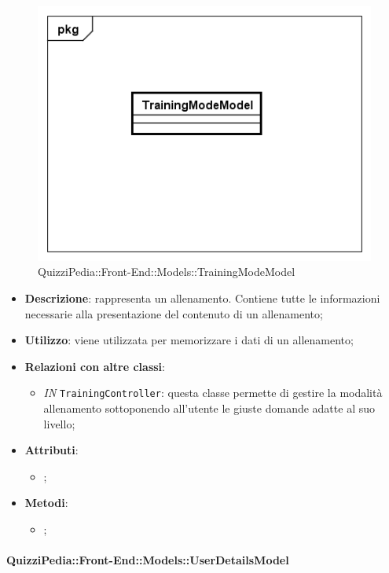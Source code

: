 		\begin{figure}[h]
			\centering
			\includegraphics[scale=0.5,keepaspectratio]{UML/Classi/Front-End/QuizziPedia_Front-end_Models_TrainingModeModel.png}
			\caption{QuizziPedia::Front-End::Models::TrainingModeModel}
		\end{figure}
		
		\begin{itemize}
			\item \textbf{Descrizione}: rappresenta un allenamento. Contiene tutte le informazioni necessarie alla
			presentazione del contenuto di un allenamento;
			\item \textbf{Utilizzo}: viene utilizzata per memorizzare i dati di un allenamento;
			\item \textbf{Relazioni con altre classi}: 
			\begin{itemize}
				\item \textit{IN} \texttt{TrainingController}: questa classe permette di gestire la modalità allenamento sottoponendo all'utente le giuste domande adatte al suo livello;
			\end{itemize}
			\item \textbf{Attributi}: 
			\begin{itemize}
				\item ;
			\end{itemize}
			\item \textbf{Metodi}: 
			\begin{itemize}
				\item ;
			\end{itemize}
		\end{itemize}
			
		\paragraph{QuizziPedia::Front-End::Models::UserDetailsModel}
		
